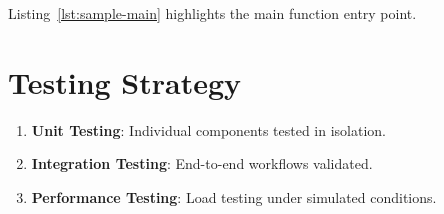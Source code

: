 Listing~\ref{lst:sample-main} highlights the main function entry point.




\section{Testing Strategy}
\label{sec:testing}

\lipsum[14]


\lipsum[10]



\begin{enumerate}[label=\arabic*.]
  \item \textbf{Unit Testing}: Individual components tested in isolation.
  \item \textbf{Integration Testing}: End-to-end  workflows validated.
  \item \textbf{Performance Testing}: Load testing  under simulated conditions.
\end{enumerate}

\lipsum[25]
